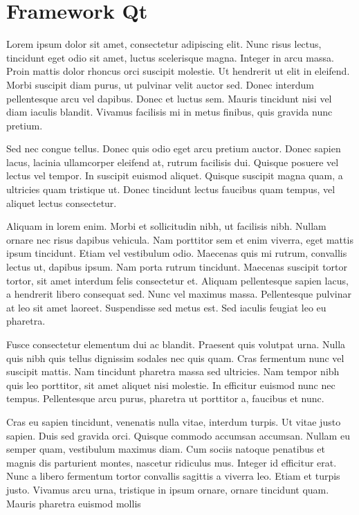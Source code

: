 \documentclass{report}
\begin{document}
        \section{Framework Qt}
            Lorem ipsum dolor sit amet, consectetur adipiscing elit. Nunc risus lectus, tincidunt eget odio sit amet, luctus scelerisque magna. Integer in arcu massa. Proin mattis dolor rhoncus orci suscipit molestie. Ut hendrerit ut elit in eleifend. Morbi suscipit diam purus, ut pulvinar velit auctor sed. Donec interdum pellentesque arcu vel dapibus. Donec et luctus sem. Mauris tincidunt nisi vel diam iaculis blandit. Vivamus facilisis mi in metus finibus, quis gravida nunc pretium.

            Sed nec congue tellus. Donec quis odio eget arcu pretium auctor. Donec sapien lacus, lacinia ullamcorper eleifend at, rutrum facilisis dui. Quisque posuere vel lectus vel tempor. In suscipit euismod aliquet. Quisque suscipit magna quam, a ultricies quam tristique ut. Donec tincidunt lectus faucibus quam tempus, vel aliquet lectus consectetur.

            Aliquam in lorem enim. Morbi et sollicitudin nibh, ut facilisis nibh. Nullam ornare nec risus dapibus vehicula. Nam porttitor sem et enim viverra, eget mattis ipsum tincidunt. Etiam vel vestibulum odio. Maecenas quis mi rutrum, convallis lectus ut, dapibus ipsum. Nam porta rutrum tincidunt. Maecenas suscipit tortor tortor, sit amet interdum felis consectetur et. Aliquam pellentesque sapien lacus, a hendrerit libero consequat sed. Nunc vel maximus massa. Pellentesque pulvinar at leo sit amet laoreet. Suspendisse sed metus est. Sed iaculis feugiat leo eu pharetra.

            Fusce consectetur elementum dui ac blandit. Praesent quis volutpat urna. Nulla quis nibh quis tellus dignissim sodales nec quis quam. Cras fermentum nunc vel suscipit mattis. Nam tincidunt pharetra massa sed ultricies. Nam tempor nibh quis leo porttitor, sit amet aliquet nisi molestie. In efficitur euismod nunc nec tempus. Pellentesque arcu purus, pharetra ut porttitor a, faucibus et nunc.

            Cras eu sapien tincidunt, venenatis nulla vitae, interdum turpis. Ut vitae justo sapien. Duis sed gravida orci. Quisque commodo accumsan accumsan. Nullam eu semper quam, vestibulum maximus diam. Cum sociis natoque penatibus et magnis dis parturient montes, nascetur ridiculus mus. Integer id efficitur erat. Nunc a libero fermentum tortor convallis sagittis a viverra leo. Etiam et turpis justo. Vivamus arcu urna, tristique in ipsum ornare, ornare tincidunt quam. Mauris pharetra euismod mollis
\end{document}
